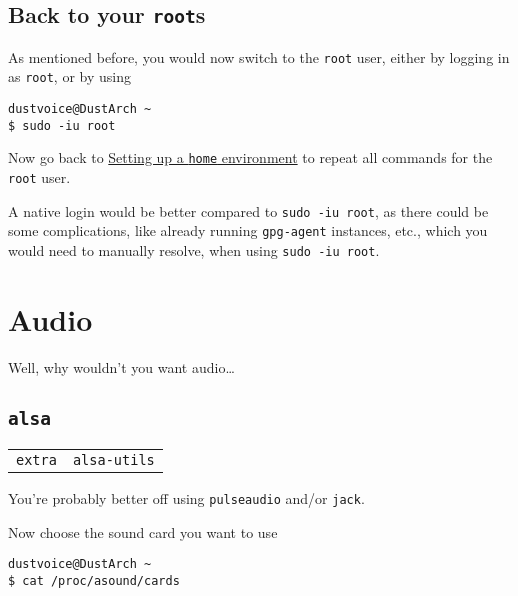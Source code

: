 \documentclass[9pt]{report}
\newenvironment{NOTE}
{\begin{tcolorbox}[colback=admonitionBG,coltitle=draculaFG,colframe=draculaBlue,colbacktitle=draculaBlue,title=NOTE]}
{\end{tcolorbox}}
\newenvironment{WARNING}
{\begin{tcolorbox}[colback=admonitionBG,coltitle=draculaBG,colframe=draculaOrange,colbacktitle=draculaOrange,title=WARNING]}
{\end{tcolorbox}}
\newenvironment{packagetable}
{\begin{longtabu}to \textwidth [b]{X[1,r]|X[1,l]}}
{\end{longtabu}}
\begin{document}
\newpage

\hypertarget{x-back-to-your-roots}{\subsection{Back to your \texttt{root}s}}
As mentioned before, you would now switch to the \texttt{root} user, either by logging in as \texttt{root}, or by using


\begin{verbatim}
dustvoice@DustArch ~
$ sudo -iu root
\end{verbatim}

Now go back to \hyperlink{x-setup-home}{Setting up a \texttt{home} environment} to repeat all commands for the \texttt{root} user.


\begin{WARNING}
    A native login would be better compared to \texttt{sudo -iu root}, as there could be some complications, like already running \texttt{gpg-agent} instances, etc., which you would need to manually resolve, when using \texttt{sudo -iu root}.

\end{WARNING}

\newpage

\hypertarget{x-audio}{\section{Audio}}
Well, why wouldn’t you want audio…​



\newpage

\hypertarget{x-alsa}{\subsection{\texttt{alsa}}}
\begin{packagetable}
    \texttt{extra} & \texttt{alsa-utils} \\ 
\end{packagetable}

\begin{NOTE}
    You’re probably better off using \texttt{pulseaudio} and/or \texttt{jack}.

\end{NOTE}
Now choose the sound card you want to use


\begin{verbatim}
dustvoice@DustArch ~
$ cat /proc/asound/cards
\end{verbatim}
\end{document}
